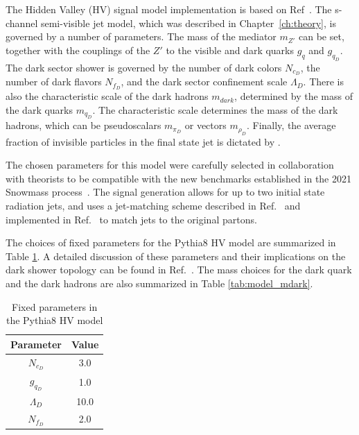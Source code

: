 The Hidden Valley (HV) signal model implementation is based on Ref~\cite{darkqcd}. 
The s-channel semi-visible jet model, which was described in Chapter~\ref{ch:theory}, is governed by a number of parameters. 
The mass of the mediator $m_{Z'}$ can be set, together with the couplings of the $Z'$ to the visible and dark quarks $g_q$ and $g_{q_D}$. 
The dark sector shower is governed by the number of dark colors $N_{c_D}$, the number of dark flavors $N_{f_D}$, and the dark sector confinement scale $\Lambda_D$. 
There is also the characteristic scale of the dark hadrons $m_{dark}$, determined by the mass of the dark quarks $m_{q_D}$. 
The characteristic scale determines the mass of the dark hadrons, which can be pseudoscalars $m_{\pi_D}$ or vectors $m_{\rho_D}$.
Finally, the average fraction of invisible particles in the final state jet is dictated by \rinv. 

The chosen parameters for this model were carefully selected in collaboration with theorists to be compatible with the new benchmarks established in the 2021 Snowmass process~\cite{snowmass}. 
The signal generation allows for up to two initial state radiation jets, and uses a jet-matching scheme described in Ref.~\cite{mlm} and implemented in Ref.~\cite{pythia} to match jets to the original partons.

The choices of fixed parameters for the Pythia8 HV model are summarized in Table \ref{tab:model_fixed_params}.
A detailed discussion of these parameters and their implications on the dark shower topology can be found in Ref.~\cite{snowmass}. 
The mass choices for the dark quark and the dark hadrons are also summarized in Table \ref{tab:model_mdark}. 

\begin{table}
\centering
  \begin{tabular}{ |c|c| }
    \hline
    Parameter & Value \\
    \hline
     $N_{c_D}$ & 3.0 \\
     $g_{q_D}$& 1.0\\
     $\Lambda_D$ & 10.0\\
     $N_{f_D}$ & 2.0\\
    \hline
  \end{tabular}
  \caption{Fixed parameters in the Pythia8 HV model}
  \label{tab:model_fixed_params}
\end{table}

